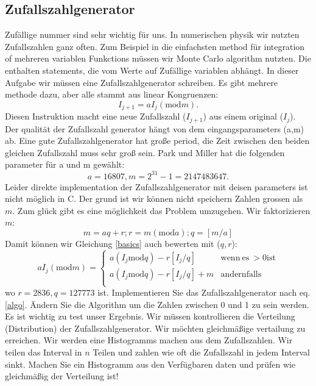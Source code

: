 \documentclass{article}[12pt]
\begin{document}
\subsection{Zufallszahlgenerator}
Zufällige nummer sind sehr wichtig für uns. In numerischen physik wir nutzten Zufallszahlen ganz often. Zum Beispiel 
in die einfachsten method für integration of mehreren variablen Funkctions müssen wir Monte Carlo algorithm nutzten. Die
enthalten statements, die vom Werte auf Zufällige variablen abhängt. In dieser Aufgabe wir müssen eine Zufallszahlgenerator
schreiben. Es gibt mehrere methode dazu, aber alle stammt aus linear Kongruenzen:
\begin{equation}
I_{j+1}=a I_{j} \left( \mathrm{mod} m\right).
\label{basics}
\end{equation}
Diesen Instruktion macht eine neue Zufallszahl ($I_{j+1}$)  aus einem original ($I_j$). Der qualität der Zufallszahl generator
hängt von dem eingangsparameters (a,m) ab. Eine gute Zufallszahlgenerator hat große period, die Zeit zwischen den beiden gleichen
Zufallszahl muss sehr groß sein. Park und Miller hat die folgenden parameter für a und m gewählt:
\begin{equation}
a=16807, m=2^{31}-1=2147483647. 
\end{equation}
Leider direkte implementation der Zufallszahlgenerator mit deisen parameters ist nicht möglich in C. Der grund ist
wir können nicht speichern Zahlen grossen als $m$. Zum glück gibt es eine möglichkeit das Problem umzugehen. 
Wir faktorizieren $m$:
\begin{equation}
m= aq + r; r= m \left(\mathrm{mod}a\right); q= \left[m/a\right]
\end{equation}
Damit können wir Gleichung \ref{basics} auch bewerten mit ($q,r$):
\begin{equation}
a I_j \left( \mathrm{mod} m\right)=  
\left\{ \begin{array}{rc}
a\left(I_j \mathrm{mod} q\right) -r \left[I_j/q\right] & \mathrm{wenn~es~}>0\mathrm{ist} \\ 
a\left(I_j \mathrm{mod} q\right) -r \left[I_j/q\right] + m & \mathrm{andernfalls} \\ 
\end{array}\right.
\label{algo}
\end{equation}
wo $r=2836,q=127773$ ist. Implementieren Sie das Zufallszahlgenerator nach eq.\ref{algo}. Ändern Sie die Algorithm
um die Zahlen zwischen 0 und 1 zu sein werden.
Es ist wichtig zu test unser Ergebnis. Wir müssen kontrollieren die Verteilung (Distribution) der Zufallszahlgenerator.
Wir möchten gleichmäßige vertailung zu erreichen. Wir werden eine Histogramms machen aus dem Zufallszahlen. Wir teilen 
das Interval in $n$ Teilen und zahlen wie oft die Zufallszahl in jedem Interval sinkt. Machen Sie ein Histogramm aus 
den Verfügbaren daten und prüfen wie gleichmäßig der Verteilung ist!
\end{document}
